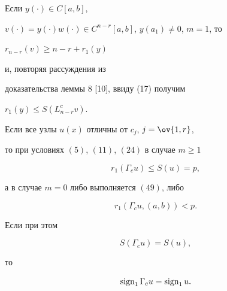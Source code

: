  


\begin{notenonum} Если $y(\cdot)\in C[a,b]$, 


$v(\cdot)=y(\cdot)w(\cdot)\in C^{n-r}[a,b]$, $y(a_1)\ne 0$, $m=1$, то 


$r_{n-r}(v)\ge n-r+r_1(y)$ 


и, повторяя рассуждения из 


доказательства леммы 8 [10], ввиду (17) получим 


$r_1(y)\le S(L^c_{n-r}v)$. 


\end{notenonum} 


 


\begin{lem} Если все узлы $u(x)$ отличны от $c_j$, $j=\ov{1,r}$, 


то при условиях $(5)$, $(11)$, $(24)$ в случае $m\ge 1$ 


\begin{equation} 


r_1(\Gamma_c u)\le S(u)=p, 


\end{equation} 


а в случае $m=0$ либо выполняется $(49)$, либо 


\begin{equation} 


r_1(\Gamma_c u,(a,b))<p. 


\end{equation} 


 


Если при этом 


\begin{equation} 


S(\Gamma_c u)=S(u), 


\end{equation} 


то 


\begin{equation} 


\sign_1\Gamma_c u=\sign_1 u. 


\end{equation} 


\end{lem} 


 


